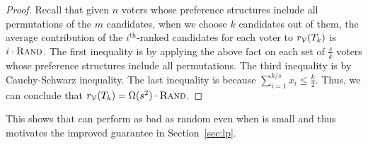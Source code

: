 \begin{proof}
Recall that given $n$ voters whose preference structures include all permutations of the $m$ candidates, when we choose $k$ candidates out of them, the average contribution of the $i^{\text{th}}$-ranked candidates for each voter to $r_{\mathcal{V}}(T_k)$ is $i\cdot {\normalfont\textsc{Rand}}$. The first inequality is by applying the above fact on each set of $\frac{s}{k}$ voters whose preference structures include all permutations. The third inequality is by Cauchy-Schwarz inequality. The last inequality is because $\sum_{i = 1}^{k/s}x_i \leq \frac{k}{2}$. Thus, we can conclude that $r_{\mathcal{V}}(T_k) = \Omega(s^2)\cdot {\normalfont\textsc{Rand}}$.
\end{proof}


This shows that \g{} can perform as bad as random even when \opt{} is small and thus motivates the improved guarantee in Section~\ref{sec:lp}.

